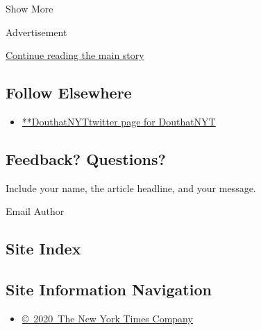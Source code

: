 Show More

Advertisement

\protect\hyperlink{after-mid2}{Continue reading the main story}

\hypertarget{follow-elsewhere}{%
\subsection{Follow Elsewhere}\label{follow-elsewhere}}

\begin{itemize}
\tightlist
\item
  \href{https://twitter.com/DouthatNYT}{**DouthatNYTtwitter page for
  DouthatNYT}
\end{itemize}

\hypertarget{feedback-questions}{%
\subsection{Feedback? Questions?}\label{feedback-questions}}

Include your name, the article headline, and your message.

Email Author

\hypertarget{site-index}{%
\subsection{Site Index}\label{site-index}}

\hypertarget{site-information-navigation}{%
\subsection{Site Information
Navigation}\label{site-information-navigation}}

\begin{itemize}
\tightlist
\item
  \href{https://help.nytimes.com/hc/en-us/articles/115014792127-Copyright-notice}{©~2020~The
  New York Times Company}
\end{itemize}

